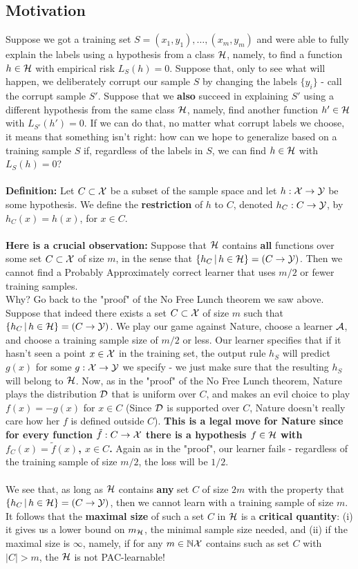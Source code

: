\subsection{Motivation}

Suppose we got a training set $S = (x_1,y_1),\ldots,(x_m,y_m)$ and were able to fully explain the labels using a hypothesis from a class $\mathcal{H}$, namely, to find a function $h\in\mathcal{H}$ with empirical risk $L_S(h)=0$. Suppose that, only to see what will happen, we deliberately corrupt our sample $S$ by changing the labels $\{y_i\}$ - call the corrupt sample $S'$. Suppose that we  {\bf also} succeed in explaining $S'$  using a different hypothesis from the same class $\mathcal{H}$, namely, find another function $h'\in\mathcal{H}$ with $L_{S'}(h')=0$. If we can do that, no matter what corrupt labels we choose, it means that something isn't right: how can we hope to generalize based on a training sample $S$ if, regardless of the labels in $S$, we can find $h\in\mathcal{H}$ with $L_S(h)=0$? 
\\~\\
{\bf Definition:} Let $C\subset\mathcal{X}$ be a subset of the sample space and let $h:\mathcal{X}\to\mathcal{Y}$ be some hypothesis. 
We define the {\bf restriction} of $h$ to $C$, denoted $h_C:C\to\mathcal{Y}$, by $h_C(x)=h(x)$, for $x\in C$.
\\~\\
{\bf Here is a crucial observation:} Suppose that $\mathcal{H}$ contains {\bf all} functions over some set $C\subset\mathcal{X}$ of size $m$, in the sense that $\{h_C\,|\,h\in\mathcal{H}\} = (C\to\mathcal{Y})$. Then we cannot find a Probably Approximately correct learner that uses $m/2$ or fewer training samples.\\
Why? Go back to the "proof" of the No Free Lunch theorem we saw above. Suppose that indeed there exists a set $C\subset \mathcal{X}$ of size $m$ such that $\{h_C\,|\,h\in\mathcal{H}\} = (C\to\mathcal{Y})$. We play our game against Nature, choose a learner $\mathcal{A}$, and choose a training sample size of $m/2$ or less. Our learner specifies that if it hasn't seen a point $x\in\mathcal{X}$ in the training set, the output rule $h_S$ will predict $g(x)$ for some $g:\mathcal{X}\to\mathcal{Y}$ we specify - we just make sure that the resulting $h_S$ will belong to $\mathcal{H}$. 
Now, as in the "proof" of the No Free Lunch theorem, Nature plays the distribution $\mathcal{D}$ that is uniform over  $C$, and makes an evil choice to play $f(x)=-g(x)$ for $x\in C$ (Since $\mathcal{D}$ is supported over $C$, Nature doesn't really care how her $f$ is defined outside $C$). {\bf This is a legal move for Nature since for every function $\tilde{f}:C\to\mathcal{X}$ there is a hypothesis $f\in\mathcal{H}$ with $f_C(x)=\tilde{f}(x)$, $x\in C$.} Again as in the "proof", our learner fails - regardless of the training sample of size $m/2$, the loss will be $1/2$.
\\~\\
We see that, as long as $\mathcal{H}$ contains {\bf any} set $C$ of size $2m$ with the property that $\{h_C\,|\,h\in\mathcal{H}\} = (C\to\mathcal{Y})$, then we cannot learn with a training sample of size $m$. It follows that the {\bf maximal size} of such a set $C$ in $\mathcal{H}$ is a {\bf critical quantity}: (i) it gives us a lower bound on $m_{\mathcal{H}}$, the minimal sample size needed, and (ii) if the maximal size is $\infty$, namely, if for any $m\in\mathbb{N} \mathcal{X}$ contains such as set $C$ with $|C|>m$, the $\mathcal{H}$ is not PAC-learnable!

